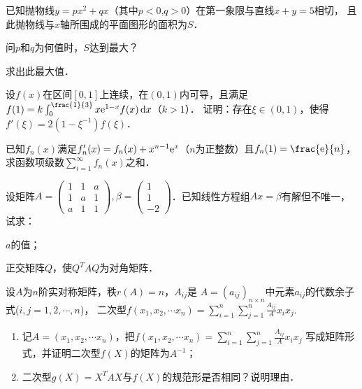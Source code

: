 \documentclass[plain,noanswer,medmath]{../../template/jnuexam}
\begin{document}

\begin{problem}
已知抛物线$y = px^2 + qx$（其中$p < 0$,$q > 0$）在第一象限与直线$x + y = 5$相切，
且此抛物线与$x$轴所围成的平面图形的面积为$S$．\par
\begin{enumerate*}
\item 问$p$和$q$为何值时，$S$达到最大？
\item 求出此最大值．
\end{enumerate*}
\end{problem}



\begin{problem}
设$f(x)$在区间$[0,1]$上连续，在$(0,1)$内可导，且满足$f(1) = k\int_0^{\frac{1}{3}} x\e^{1 - x} f(x)\dx$（$k > 1$）．
证明：存在$\xi \in \left(0,1 \right)$，使得$f'(\xi) = 2(1 - \xi^{-1})f(\xi)$．
\end{problem}



\begin{problem}
已知$f_n(x)$满足$f'_n(x) = f_n(x) + x^{n - 1}\mathrm{e}^x$（$n$为正整数）且$f_n(1) = \frac{\e}{n}$，
求函数项级数$\sum_{i = 1}^{\infty}f_n^{}(x)$之和．
\end{problem}



\begin{problem}
设矩阵$A = \begin{pmatrix}
  1 & 1 & a \\
  1 & a & 1 \\
  a & 1 & 1
\end{pmatrix},\beta = \begin{pmatrix}
  1 \\
  1 \\
  -2
\end{pmatrix}$．已知线性方程组$Ax = \beta$有解但不唯一，试求：
\begin{enumerate*}
\item $a$的值；
\item 正交矩阵$Q$，使$Q^T AQ$为对角矩阵．
\end{enumerate*}
\end{problem}



\begin{problem}
设$A$为$n$阶实对称矩阵，秩$r(A) = n$，$A_{ij}$是
$A = \left(a_{ij} \right)_{n \times n}$中元素$a_{ij}$的代数余子式($i,j = 1,2, \cdots ,n$)，
二次型$f(x_1,x_2, \cdots x_n) = \sum_{i = 1}^n \sum_{j = 1}^n \frac{A_{ij}}{A} x_i x_j.$
\begin{enumerate}
\item 记$A = (x_1,x_2, \cdots x_n)$，把$f(x_1,x_2, \cdots x_n) = \sum_{i = 1}^n \sum_{j = 1}^n \frac{A_{ij}}{A} x_i x_j$
写成矩阵形式，并证明二次型$f(X)$的矩阵为$A^{-1}$；
\item 二次型$g(X) = X^T AX$与$f(X)$的规范形是否相同？说明理由．
\end{enumerate}
\end{problem}
\end{document}
